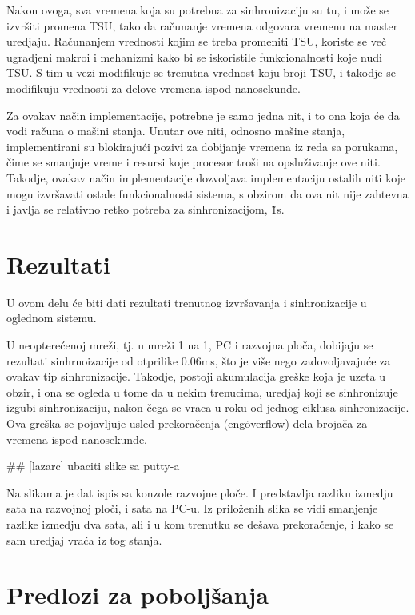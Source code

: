 \documentclass[a4paper,12pt, master]{etf}
\begin{document}
	Nakon ovoga, sva vremena koja su potrebna za sinhronizaciju su tu, i
	mo\v{z}e se izvr\v{s}iti promena TSU, tako da ra\v{c}unanje vremena
	odgovara vremenu na master uredjaju. Ra\v{c}unanjem vrednosti kojim se
	treba promeniti TSU, koriste se ve\v{c} ugradjeni makroi i mehanizmi kako
	bi se iskoristile funkcionalnosti koje nudi TSU\@. S tim u vezi modifikuje
	se trenutna vrednost koju broji TSU, i takodje se modifikuju vrednosti za
	delove vremena ispod nanosekunde.

	Za ovakav na\v{c}in implementacije, potrebne je samo jedna nit, i to ona
	koja \'{c}e da vodi ra\v{c}una o ma\v{s}ini stanja. Unutar ove niti,
	odnosno ma\v{s}ine stanja, implementirani su blokiraju\'{c}i pozivi za
	dobijanje vremena iz reda sa porukama, \v{c}ime se smanjuje vreme i resursi
	koje procesor tro\v{s}i na opslu\v{z}ivanje ove niti. Takodje, ovakav
	na\v{c}in implementacije dozvoljava implementaciju ostalih niti koje mogu
	izvr\v{s}avati ostale funkcionalnosti sistema, s obzirom da ova nit nije
	zahtevna i javlja se relativno retko potreba za sinhronizacijom, \~ 1s.

	\section{Rezultati}

	U ovom delu \'{c}e biti dati rezultati trenutnog izvr\v{s}avanja i
	sinhronizacije u oglednom sistemu.

	U neoptere\'{c}enoj mre\v{z}i, tj\@. u mre\v{z}i 1 na 1, PC i razvojna
	plo\v{c}a, dobijaju se rezultati sinhrnoizacije od otprilike 0.06ms,
	\v{s}to je vi\v{s}e nego zadovoljavaju\'{c}e za ovakav tip sinhronizacije.
	Takodje, postoji akumulacija gre\v{s}ke koja je uzeta u obzir, i ona se
	ogleda u tome da u nekim trenucima, uredjaj koji se	sinhronizuje izgubi
	sinhronizaciju, nakon \v{c}ega se vraca u roku od jednog ciklusa
	sinhronizacije. Ova gre\v{s}ka se pojavljuje usled prekora\v{c}enja
	(eng\. overflow) dela broja\v{c}a za vremena ispod nanosekunde.

	\#\# [lazarc] ubaciti slike sa putty-a

	Na slikama je dat ispis sa konzole razvojne plo\v{c}e. I predstavlja
	razliku izmedju sata na razvojnoj plo\v{c}i, i sata na PC-u. Iz
	prilo\v{z}enih slika se vidi smanjenje razlike izmedju dva sata, ali i u
	kom trenutku se de\v{s}ava prekora\v{c}enje, i kako se sam uredjaj
	vra\'{c}a iz tog stanja.

	\section{Predlozi za pobolj\v{s}anja}
\end{document}
